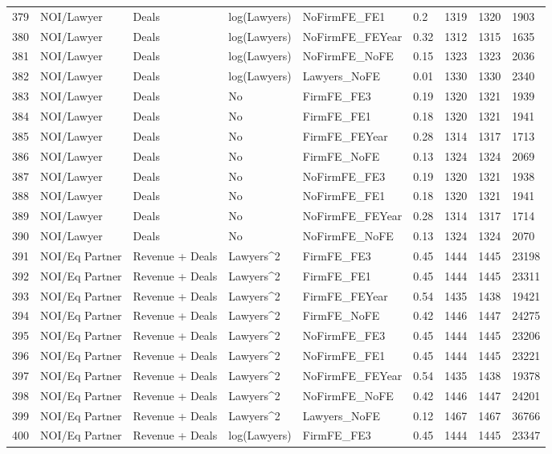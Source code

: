 \documentclass{article}
\begin{document}
\begin{table}[H]
\begin{tabular}{rllllllll}
  379 & NOI/Lawyer & Deals & log(Lawyers) & NoFirmFE\_FE1 & 0.2 & 1319 & 1320 & 1903 \\ 
  380 & NOI/Lawyer & Deals & log(Lawyers) & NoFirmFE\_FEYear & 0.32 & 1312 & 1315 & 1635 \\ 
  381 & NOI/Lawyer & Deals & log(Lawyers) & NoFirmFE\_NoFE & 0.15 & 1323 & 1323 & 2036 \\ 
  382 & NOI/Lawyer & Deals & log(Lawyers) & Lawyers\_NoFE & 0.01 & 1330 & 1330 & 2340 \\ 
  383 & NOI/Lawyer & Deals & No & FirmFE\_FE3 & 0.19 & 1320 & 1321 & 1939 \\ 
  384 & NOI/Lawyer & Deals & No & FirmFE\_FE1 & 0.18 & 1320 & 1321 & 1941 \\ 
  385 & NOI/Lawyer & Deals & No & FirmFE\_FEYear & 0.28 & 1314 & 1317 & 1713 \\ 
  386 & NOI/Lawyer & Deals & No & FirmFE\_NoFE & 0.13 & 1324 & 1324 & 2069 \\ 
  387 & NOI/Lawyer & Deals & No & NoFirmFE\_FE3 & 0.19 & 1320 & 1321 & 1938 \\ 
  388 & NOI/Lawyer & Deals & No & NoFirmFE\_FE1 & 0.18 & 1320 & 1321 & 1941 \\ 
  389 & NOI/Lawyer & Deals & No & NoFirmFE\_FEYear & 0.28 & 1314 & 1317 & 1714 \\ 
  390 & NOI/Lawyer & Deals & No & NoFirmFE\_NoFE & 0.13 & 1324 & 1324 & 2070 \\ 
  391 & NOI/Eq Partner & Revenue + Deals & Lawyers^2 & FirmFE\_FE3 & 0.45 & 1444 & 1445 & 23198 \\ 
  392 & NOI/Eq Partner & Revenue + Deals & Lawyers^2 & FirmFE\_FE1 & 0.45 & 1444 & 1445 & 23311 \\ 
  393 & NOI/Eq Partner & Revenue + Deals & Lawyers^2 & FirmFE\_FEYear & 0.54 & 1435 & 1438 & 19421 \\ 
  394 & NOI/Eq Partner & Revenue + Deals & Lawyers^2 & FirmFE\_NoFE & 0.42 & 1446 & 1447 & 24275 \\ 
  395 & NOI/Eq Partner & Revenue + Deals & Lawyers^2 & NoFirmFE\_FE3 & 0.45 & 1444 & 1445 & 23206 \\ 
  396 & NOI/Eq Partner & Revenue + Deals & Lawyers^2 & NoFirmFE\_FE1 & 0.45 & 1444 & 1445 & 23221 \\ 
  397 & NOI/Eq Partner & Revenue + Deals & Lawyers^2 & NoFirmFE\_FEYear & 0.54 & 1435 & 1438 & 19378 \\ 
  398 & NOI/Eq Partner & Revenue + Deals & Lawyers^2 & NoFirmFE\_NoFE & 0.42 & 1446 & 1447 & 24201 \\ 
  399 & NOI/Eq Partner & Revenue + Deals & Lawyers^2 & Lawyers\_NoFE & 0.12 & 1467 & 1467 & 36766 \\ 
  400 & NOI/Eq Partner & Revenue + Deals & log(Lawyers) & FirmFE\_FE3 & 0.45 & 1444 & 1445 & 23347 \\ 
   \hline
\end{tabular}
\end{table}
\end{document}
